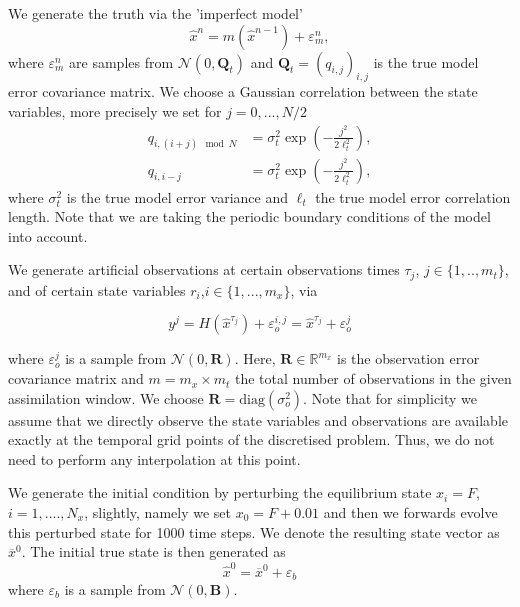 \documentclass[a4paper,10pt]{article}
\numberwithin{equation}{section}
\begin{document}
 We generate the truth via the 'imperfect model'
 \begin{equation}\hat x^n=m(\hat x^{n-1})+\varepsilon_m^n,\end{equation}
 where $\varepsilon_m^n$ are samples from $\mathcal N(0,\mathbf Q_t)$ and $\mathbf Q_t=(q_{i,j})_{i,j}$ is the true model error covariance matrix. We choose a Gaussian correlation between the state variables, more precisely we set  for $j=0,...,N/2$ 
 \begin{align*}
q_{i,(i+j)\mod{N}} &= \sigma_t^2\exp\left(-\frac{j^2}{2\ell_t^2}\right),\\
q_{i,i-j}& = \sigma_t^2 \exp\left(-\frac{j^2}{2\ell_t^2}\right),
 \end{align*}
where $\sigma_t^2$ is the true model error variance and $\ell_t$ the true model error correlation length. Note that we are taking the periodic boundary conditions of the model into account.

We generate artificial observations at certain observations times $\tau_j$, $j\in\{1,..,m_t\}$, and of certain state variables $r_i$,$i \in \{1,...,m_x\}$, via 

 \begin{equation}y^{j}=H(\hat x^{\tau_j})+\varepsilon_o^{i,j}=\hat x^{\tau_j}+\varepsilon_o^{j}\end{equation}

 where $\varepsilon_o^{j}$ is a sample from $\mathcal N(0,\mathbf R)$. Here, $ \mathbf R\in \mathbb R^{m_x}$ is the observation error covariance matrix and $m=m_x\times m_t$ the total number of observations in the given assimilation window. We choose ${\mathbf R}=\text{diag}(\sigma_o^2)$. Note that for simplicity we assume that we directly observe the state variables and observations are available exactly at the temporal grid points of the discretised problem. Thus, we do not need to perform any interpolation at this point. %
 
We generate the initial condition by perturbing the equilibrium state $x_i=F$,  $i=1,....,N_x$, slightly, namely we set $x_0=F+0.01$ and then we forwards evolve this  perturbed state for 1000 time steps. We denote the resulting state vector as $\overline x^0$. The initial true state is then generated as 
\begin{equation}\hat x^0=\overline x^0+\varepsilon_b\end{equation}
where $\varepsilon_b$ is a sample from $\mathcal N(0,{\mathbf B})$.
\end{document}
